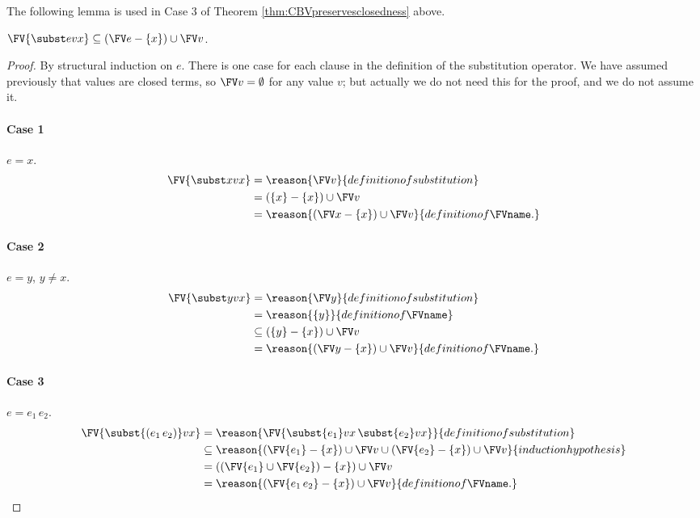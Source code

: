 The following lemma is used in Case 3 of Theorem \ref{thm:CBVpreservesclosedness} above.

\begin{lemma}
$\FV{\subst evx} \subseteq (\FV e - \{x\}) \cup \FV v$.
\end{lemma}

\begin{proof}
By structural induction on $e$. There is one case for each clause in the definition of the substitution operator. We have assumed previously that values are closed terms, so $\FV v=\emptyset$ for any value $v$; but actually we do not need this for the proof, and we do not assume it.

\paragraph{Case 1}
$e = x$.
\begin{align*}
\FV{\subst xvx}
&= \reason{\FV v}{definition of substitution}\\
&= (\{x\} - \{x\}) \cup \FV v\\
&= \reason{(\FV x - \{x\}) \cup \FV v}{definition of \FVname.}
\end{align*}

\paragraph{Case 2}
$e = y$, $y\neq x$.
\begin{align*}
\FV{\subst yvx}
&= \reason{\FV y}{definition of substitution}\\
&= \reason{\{y\}}{definition of \FVname}\\
&\subseteq (\{y\} - \{x\}) \cup \FV v\\
&= \reason{(\FV y - \{x\}) \cup \FV v}{definition of \FVname.}
\end{align*}

\paragraph{Case 3}
$e = e_1\,e_2$.
\begin{align*}
\FV{\subst{(e_1\,e_2)}vx}
&= \reason{\FV{\subst{e_1}vx\,\subst{e_2}vx}}{definition of substitution}\\
&\subseteq \reason{(\FV{e_1} - \{x\}) \cup \FV v \cup (\FV{e_2} - \{x\}) \cup \FV v}{induction hypothesis}\\
&= ((\FV{e_1} \cup \FV{e_2}) - \{x\}) \cup \FV v\\
&= \reason{(\FV{e_1\,e_2} - \{x\}) \cup \FV v}{definition of \FVname.}
\end{align*}


\end{proof}

